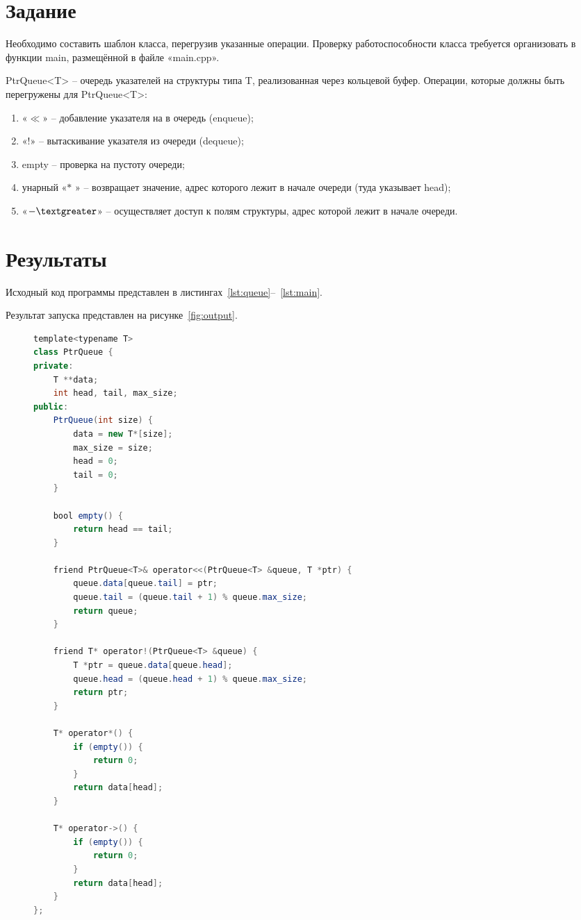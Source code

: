 \documentclass[a4paper, 14pt]{extarticle}
\begin{document}
\renewcommand{\ttdefault}{pcr}

\setlength{\tabcolsep}{3pt}
\newpage
\setcounter{page}{2}

\section{Задание}\label{Sect::task}

Необходимо составить шаблон класса,
перегрузив указанные операции. Проверку работоспособности класса
требуется организовать в функции main, размещённой в файле «main.cpp».

PtrQueue<T> – очередь указателей на структуры
типа T, реализованная через кольцевой буфер.
Операции, которые должны быть перегружены
для PtrQueue<T>:
\begin{enumerate}
    \item «$\ll$» -- добавление указателя на в очередь (enqueue);
    \item «$\text{!}$» -- вытаскивание указателя из очереди (dequeue);
    \item empty -- проверка на пустоту очереди;
    \item унарный «$\ast$ » -- возвращает значение, адрес которого лежит в начале очереди (туда указывает head);
    \item «$-\textgreater$» -- осуществляет доступ к полям структуры, адрес которой лежит в начале очереди.
\end{enumerate}

\section{Результаты}\label{Sect::res}

Исходный код программы представлен в листингах~\ref{lst:queue}--~\ref{lst:main}.

Результат запуска представлен на рисунке~\ref{fig:output}.

\begin{figure}[!htb]
\begin{lstlisting}[language=Java,caption={Класс PtrQueue},label={lst:queue}]
template<typename T>
class PtrQueue {
private:
    T **data;
    int head, tail, max_size;
public:
    PtrQueue(int size) {
        data = new T*[size];
        max_size = size;
        head = 0;
        tail = 0;
    }
    
    bool empty() {
        return head == tail;
    }

    friend PtrQueue<T>& operator<<(PtrQueue<T> &queue, T *ptr) {
        queue.data[queue.tail] = ptr;
        queue.tail = (queue.tail + 1) % queue.max_size;
        return queue;
    }

    friend T* operator!(PtrQueue<T> &queue) {
        T *ptr = queue.data[queue.head];
        queue.head = (queue.head + 1) % queue.max_size;
        return ptr;
    }

    T* operator*() {
        if (empty()) {
            return 0;
        }
        return data[head];
    }

    T* operator->() {
        if (empty()) {
            return 0;
        }
        return data[head];
    }
};
\end{lstlisting}
\end{figure}
\end{document}
